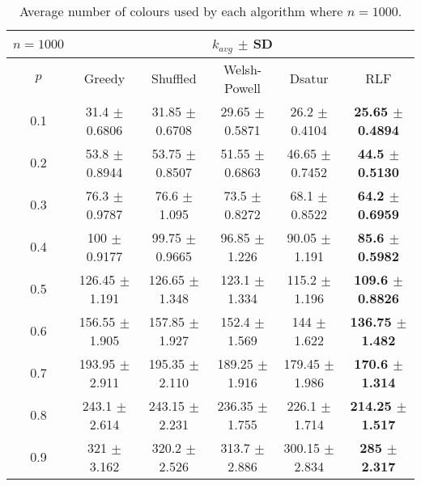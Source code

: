 \begin{table}[H]
    \centering
    \begin{tabular}{cccccc}
        
        $n = 1000$& \multicolumn{5}{c}{$k_{avg}$ $\pm$ SD} \\
        \hline
        $p$ & Greedy & Shuffled & Welsh-Powell & Dsatur & RLF \\
        \hline
0.1 & 31.4 $\pm$ 0.6806 & 31.85 $\pm$ 0.6708 & 29.65 $\pm$ 0.5871 & 26.2 $\pm$ 0.4104 & \textbf{25.65 $\pm$ 0.4894} \\
        0.2 & 53.8 $\pm$ 0.8944 & 53.75 $\pm$ 0.8507 & 51.55 $\pm$ 0.6863 & 46.65 $\pm$ 0.7452 & \textbf{44.5 $\pm$ 0.5130} \\
        0.3 & 76.3 $\pm$ 0.9787 & 76.6 $\pm$ 1.095 & 73.5 $\pm$ 0.8272 & 68.1 $\pm$ 0.8522 & \textbf{64.2 $\pm$ 0.6959} \\
        0.4 & 100 $\pm$ 0.9177 & 99.75 $\pm$ 0.9665 & 96.85 $\pm$ 1.226 & 90.05 $\pm$ 1.191 & \textbf{85.6 $\pm$ 0.5982} \\
        0.5 & 126.45 $\pm$ 1.191 & 126.65 $\pm$ 1.348 & 123.1 $\pm$ 1.334 & 115.2 $\pm$ 1.196 & \textbf{109.6 $\pm$ 0.8826} \\
        0.6 & 156.55 $\pm$ 1.905 & 157.85 $\pm$ 1.927 & 152.4 $\pm$ 1.569 & 144 $\pm$ 1.622 & \textbf{136.75 $\pm$ 1.482} \\
        0.7 & 193.95 $\pm$ 2.911 & 195.35 $\pm$ 2.110 & 189.25 $\pm$ 1.916 & 179.45 $\pm$ 1.986 & \textbf{170.6 $\pm$ 1.314} \\
        0.8 & 243.1 $\pm$ 2.614 & 243.15 $\pm$ 2.231 & 236.35 $\pm$ 1.755 & 226.1 $\pm$ 1.714 & \textbf{214.25 $\pm$ 1.517} \\
        0.9 & 321 $\pm$ 3.162 & 320.2 $\pm$ 2.526 & 313.7 $\pm$ 2.886 & 300.15 $\pm$ 2.834 & \textbf{285 $\pm$ 2.317} \\
        \hline
    \end{tabular}
    \caption{Average number of colours used by each algorithm where $n = 1000$.}
    \label{tab:avgKforV1000}
\end{table}

